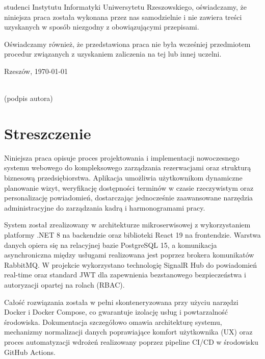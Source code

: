 \documentclass[a4paper,12pt]{article}
\begin{document}
studenci Instytutu Informatyki Uniwersytetu Rzeszowskiego, oświadczamy, że niniejsza praca została wykonana przez nas samodzielnie i nie zawiera treści uzyskanych w sposób niezgodny z obowiązującymi przepisami.

\vspace{1cm}
\noindent Oświadczamy również, że przedstawiona praca nie była wcześniej przedmiotem procedur związanych z uzyskaniem zaliczenia na tej lub innej uczelni.

\vspace{2cm}
\noindent Rzeszów, \today

\vspace{2cm}
\begin{flushright}
    \makebox[6cm]{\hrulefill}\\[0.4cm]
    {\small (podpis autora)}
\end{flushright}

\newpage
\section*{Streszczenie}

Niniejsza praca opisuje proces projektowania i implementacji nowoczesnego systemu webowego do kompleksowego zarządzania rezerwacjami oraz strukturą biznesową przedsiębiorstwa. Aplikacja umożliwia użytkownikom dynamiczne planowanie wizyt, weryfikację dostępności terminów w czasie rzeczywistym oraz personalizację powiadomień, dostarczając jednocześnie zaawansowane narzędzia administracyjne do zarządzania kadrą i harmonogramami pracy.

System został zrealizowany w architekturze mikroserwisowej z wykorzystaniem platformy .NET 8 na backendzie oraz biblioteki React 19 na frontendzie. Warstwa danych opiera się na relacyjnej bazie PostgreSQL 15, a komunikacja asynchroniczna między usługami realizowana jest poprzez brokera komunikatów RabbitMQ. W projekcie wykorzystano technologię SignalR Hub do powiadomień real-time oraz standard JWT dla zapewnienia bezstanowego bezpieczeństwa i autoryzacji opartej na rolach (RBAC).

Całość rozwiązania została w pełni skonteneryzowana przy użyciu narzędzi Docker i Docker Compose, co gwarantuje izolację usług i powtarzalność środowiska. Dokumentacja szczegółowo omawia architekturę systemu, mechanizmy normalizacji danych poprawiające komfort użytkownika (UX) oraz proces automatyzacji wdrożeń realizowany poprzez pipeline CI/CD w środowisku GitHub Actions.
\end{document}

